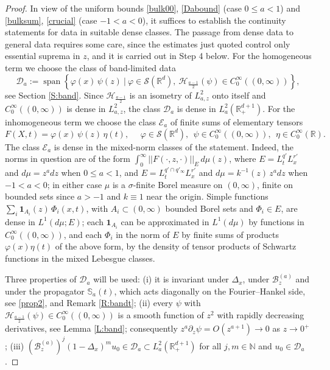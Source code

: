 \documentclass[11pt,letter]{amsart}
\def \RN {\mathbb{R}_+^{d+1}}
\def \R {\mathbb{R}}
\newcommand{\Ba}{\mathscr B_z^{(a)}}
\def \vf{\varphi}
\newcommand{\Rd}{\mathbb R^d}
\newcommand{\p}{\partial}
\numberwithin{equation}{section}
\numberwithin{equation}{section}
\begin{document}
\begin{proof}
In view of the uniform bounds \eqref{bulk00}, \eqref{Dabound} (case $0\le a<1$) and \eqref{bulksum}, \eqref{crucial} (case $-1<a<0$), it suffices to establish the continuity statements for data in suitable dense classes. The passage from dense data to general data requires some care, since the estimates just quoted control only essential suprema in $z$, and it is carried out in Step 4 below. For the homogeneous term we choose the class of band-limited data
\[
\mathcal D_a := \operatorname{span}\left\{\vf(x)\,\psi(z)\ \Big|\ \vf\in \mathscr S(\Rd),\ \mathcal H_{\frac{a-1}2}(\psi)\in C_0^\infty((0,\infty))\right\},
\]
see Section \ref{S:band}. Since $\mathcal H_{\frac{a-1}2}$ is an isometry of $L^2_{a,z}$ onto itself and $C_0^\infty((0,\infty))$ is dense in $L^2_{a,z}$, the class $\mathcal D_a$ is dense in $L^2_a(\RN)$. For the inhomogeneous term we choose the class $\mathcal E_a$ of finite sums of elementary tensors
\[
F(X,t) = \vf(x)\, \psi(z)\, \eta(t),\ \ \ \ \ \ \vf\in \mathscr S(\Rd),\ \ \psi \in C_0^\infty((0,\infty)),\ \ \eta\in C_0^\infty(\R).
\]
The class $\mathcal E_a$ is dense in the mixed-norm classes of the statement. Indeed, the norms in question are of the form $\int_0^\infty ||F(\cdot,z,\cdot)||_{E}\, d\mu(z)$, where $E = L^{q'}_tL^{r'}_x$ and $d\mu = z^adz$ when $0\le a<1$, and $E = L^{q'\cap q'_\infty}_tL^{r'}_x$ and $d\mu = k^{-1}(z)\,z^adz$ when $-1<a<0$; in either case $\mu$ is a $\sigma$-finite Borel measure on $(0,\infty)$, finite on bounded sets since $a>-1$ and $k\equiv1$ near the origin. Simple functions $\sum_i \mathbf 1_{A_i}(z)\, \Phi_i(x,t)$, with $A_i\subset(0,\infty)$ bounded Borel sets and $\Phi_i\in E$, are dense in $L^1(d\mu;E)$; each $\mathbf 1_{A_i}$ can be approximated in $L^1(d\mu)$ by functions in $C_0^\infty((0,\infty))$, and each $\Phi_i$ in the norm of $E$ by finite sums of products $\vf(x)\eta(t)$ of the above form, by the density of tensor products of Schwartz functions in the mixed Lebesgue classes.

Three properties of $\mathcal D_a$ will be used: (i) it is invariant under $\Delta_x$, under $\Ba$ and under the propagator $\mathbb S_a(t)$, which acts diagonally on the Fourier--Hankel side, see \eqref{prop2}, \cite{GS} and Remark \ref{R:bandt}; (ii) every $\psi$ with $\mathcal H_{\frac{a-1}2}(\psi)\in C_0^\infty((0,\infty))$ is a smooth function of $z^2$ with rapidly decreasing derivatives, see Lemma \ref{L:band}; consequently $z^a\p_z\psi = O(z^{a+1})\to0$ as $z\to0^+$; (iii) $\left(\Ba\right)^j(1-\Delta_x)^m u_0\in \mathcal D_a\subset L^2_a(\RN)$ for all $j, m\in \mathbb N$ and $u_0\in \mathcal D_a$.


\end{proof}
\end{document}
